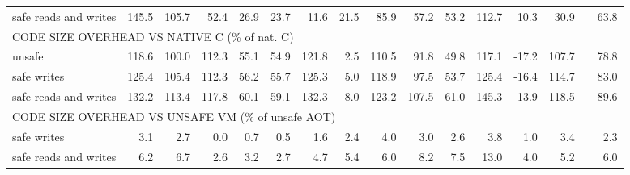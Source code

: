 \begin{landscape}
\begin{table}[t!]
\begin{tabular}{lrrrrrrrrrrrrrrr}
    safe reads and writes               &      145.5 &      105.7 &       52.4 &       26.9 &       23.7 &       11.6 &       21.5 &       85.9 &       57.2 &       53.2 &      112.7 &       10.3 &       30.9 &                   &      63.8 \\
    \multicolumn{10}{l}{CODE SIZE OVERHEAD VS NATIVE C (\% of nat. C)} \\
    unsafe                              &      118.6 &      100.0 &      112.3 &       55.1 &       54.9 &      121.8 &        2.5 &      110.5 &       91.8 &       49.8 &      117.1 &      -17.2 &      107.7 &                   &      78.8 \\
    safe writes                         &      125.4 &      105.4 &      112.3 &       56.2 &       55.7 &      125.3 &        5.0 &      118.9 &       97.5 &       53.7 &      125.4 &      -16.4 &      114.7 &                   &      83.0 \\
    safe reads and writes               &      132.2 &      113.4 &      117.8 &       60.1 &       59.1 &      132.3 &        8.0 &      123.2 &      107.5 &       61.0 &      145.3 &      -13.9 &      118.5 &                   &      89.6 \\
    \multicolumn{10}{l}{CODE SIZE OVERHEAD VS UNSAFE VM (\% of unsafe AOT)} \\
    safe writes                         &        3.1 &        2.7 &        0.0 &        0.7 &        0.5 &        1.6 &        2.4 &        4.0 &        3.0 &        2.6 &        3.8 &        1.0 &        3.4 &                   &       2.3 \\
    safe reads and writes               &        6.2 &        6.7 &        2.6 &        3.2 &        2.7 &        4.7 &        5.4 &        6.0 &        8.2 &        7.5 &       13.0 &        4.0 &        5.2 &                   &       6.0 \\
    \bottomrule
    \end{tabular}
\end{table}
\end{landscape}
\clearpage
\restoregeometry
